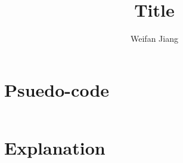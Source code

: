 \documentclass[15]{article}
\title{Title}
\author{Weifan Jiang}
\begin{document}
\maketitle

\section{Psuedo-code}
\lstset{language = Java} %

\begin{lstlisting}

\end{lstlisting}

\section{Explanation}
\end{document}
